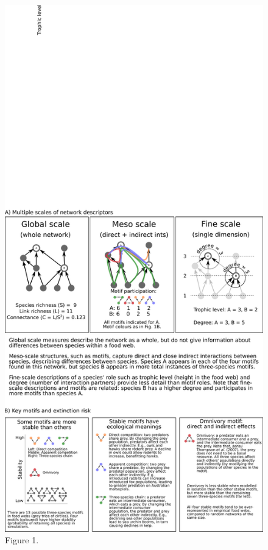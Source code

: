 \documentclass[12pt]{article}
\begin{document}
    \begin{figure}[h!]
        \caption{Figure 1.}
        \label{motifs}
        \includegraphics[width=.9\textwidth]{figures/motifs_box.eps}
    \end{figure}

    \clearpage
\end{document}
